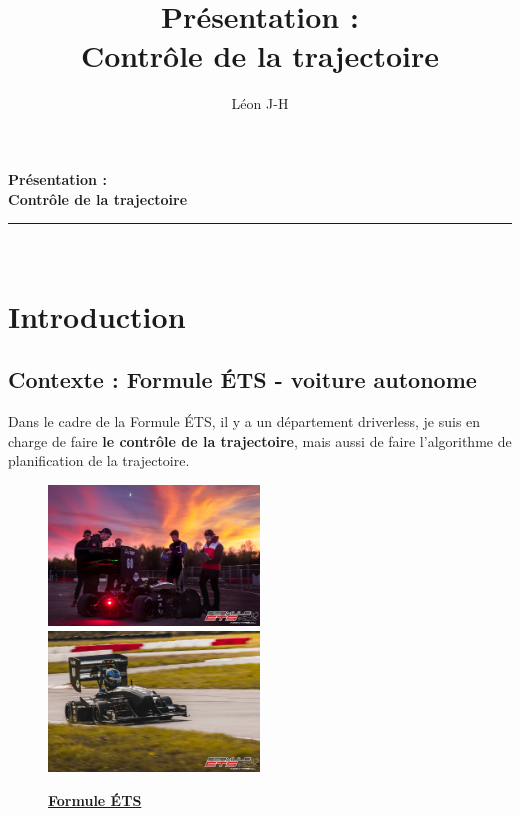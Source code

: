 \documentclass[a4paper,12pt]{extarticle}
\title{Présentation : \\ Contrôle de la trajectoire}
\author{Léon J-H}
\begin{document}
\begin{titlepage}
    \centering
    \vspace*{0.5 cm}
	{ \Huge{\bfseries{Présentation : \\ Contrôle de la trajectoire}}}\\
	\vspace*{0.5 cm}
	\rule{\linewidth}{0.2 mm} \\[1 cm]

\tableofcontents
\pagebreak


\end{titlepage}

\section{Introduction}
\subsection{Contexte : Formule ÉTS - voiture autonome}

Dans le cadre de la Formule ÉTS, il y a un département driverless, je suis en charge de faire \textbf{le contrôle de la trajectoire}, mais aussi de faire l'algorithme de planification de la trajectoire.

\begin{figure}[h]
    \centering
    \includegraphics[width=0.5\textwidth]{image/Toronto_Shoout_Out_Formule_ETS_01_10_22.jpg}\hfill
    \includegraphics[width=0.5\textwidth]{image/Toronto_Shoout_Out_Formule_ETS_01_10_22_voiture.jpg}\\
    \caption*{\href{https://formule-ets.ca/}{\textbf{Formule ÉTS}}}
\end{figure}
\end{document}
